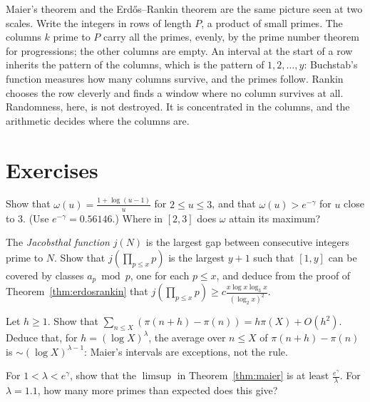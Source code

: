 \begin{beauty}
Maier's theorem and the Erd\H{o}s--Rankin theorem are the same picture seen at two scales. Write the integers in rows of length $P$, a product of small primes. The columns $k$ prime to $P$ carry all the primes, evenly, by the prime number theorem for progressions; the other columns are empty. An interval at the start of a row inherits the pattern of the columns, which is the pattern of $1,2,\dots,y$: Buchstab's function measures how many columns survive, and the primes follow. Rankin chooses the row cleverly and finds a window where no column survives at all. Randomness, here, is not destroyed. It is concentrated in the columns, and the arithmetic decides where the columns are.
\end{beauty}

\section{Exercises}

\begin{exercise}[$\star$]\label{ex:omega23}
Show that $\omega(u)=\frac{1+\log(u-1)}u$ for $2\le u\le3$, and that $\omega(u)>e^{-\gamma}$ for $u$ close to $3$. (Use $e^{-\gamma}=0.56146$.) Where in $[2,3]$ does $\omega$ attain its maximum?
\end{exercise}

\begin{exercise}[$\star\star$]\label{ex:jacobsthal}
The \emph{Jacobsthal function} $j(N)$ is the largest gap between consecutive integers prime to $N$. Show that $j(\prod_{p\le x}p)$ is the largest $y+1$ such that $[1,y]$ can be covered by classes $a_p\bmod p$, one for each $p\le x$, and deduce from the proof of Theorem~\ref{thm:erdosrankin} that $j(\prod_{p\le x}p)\ge c\frac{x\log x\log_3x}{(\log_2x)^2}$.
\end{exercise}

\begin{exercise}[$\star$]\label{ex:averageshort}
Let $h\ge1$. Show that $\sum_{n\le X}(\pi(n+h)-\pi(n))=h\pi(X)+O(h^2)$. Deduce that, for $h=(\log X)^\lambda$, the average over $n\le X$ of $\pi(n+h)-\pi(n)$ is $\sim(\log X)^{\lambda-1}$: Maier's intervals are exceptions, not the rule.
\end{exercise}

\begin{exercise}[$\star\star$]\label{ex:maierconst}
For $1<\lambda<e^\gamma$, show that the $\limsup$ in Theorem~\ref{thm:maier} is at least $\frac{e^\gamma}\lambda$. For $\lambda=1.1$, how many more primes than expected does this give?
\end{exercise}

